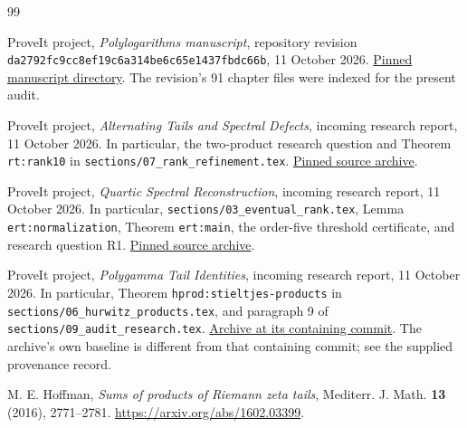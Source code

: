 \documentclass[11pt,letterpaper]{article}
\numberwithin{equation}{section}
\theoremstyle{definition}
\theoremstyle{remark}
\begin{document}
\clearpage
{}
{}
\begingroup\small
\begin{thebibliography}{99}
\raggedright
\setlength{\itemsep}{3pt}
\setlength{\parskip}{0pt}

ProveIt project,
\emph{Polylogarithms manuscript}, repository revision
\texttt{da2792fc9cc8ef19c6a314be6c65e1437fbdc66b},
11 October 2026.
\href{https://github.com/VladimirReshetnikov/ProveIt/tree/da2792fc9cc8ef19c6a314be6c65e1437fbdc66b/Analysis/Polylogarithms/docs/manuscript}{Pinned manuscript directory}.
The revision's 91 chapter files were indexed for the present audit.

ProveIt project,
\emph{Alternating Tails and Spectral Defects}, incoming research report,
11 October 2026. In particular, the two-product research question and
Theorem \texttt{rt:rank10} in \texttt{sections/07\_rank\_refinement.tex}.
\href{https://github.com/VladimirReshetnikov/ProveIt/blob/da2792fc9cc8ef19c6a314be6c65e1437fbdc66b/docs/incoming/ProveIt_Alternating_Tails_Spectral_Defects_2026-10-11.zip}{Pinned source archive}.

ProveIt project,
\emph{Quartic Spectral Reconstruction}, incoming research report,
11 October 2026. In particular, \texttt{sections/03\_eventual\_rank.tex},
Lemma \texttt{ert:normalization}, Theorem \texttt{ert:main}, the
order-five threshold certificate, and research question R1.
\href{https://github.com/VladimirReshetnikov/ProveIt/blob/da2792fc9cc8ef19c6a314be6c65e1437fbdc66b/docs/incoming/ProveIt_Quartic_Spectral_Reconstruction_2026-10-11.zip}{Pinned source archive}.

ProveIt project,
\emph{Polygamma Tail Identities}, incoming research report,
11 October 2026. In particular, Theorem
\texttt{hprod:stieltjes-products} in
\texttt{sections/06\_hurwitz\_products.tex}, and paragraph 9 of
\texttt{sections/09\_audit\_research.tex}.
\href{https://github.com/VladimirReshetnikov/ProveIt/blob/446dca9bd65c20e409d1d2561d4ffad408103e2a/docs/incoming/ProveIt_Polygamma_Tail_Identities_2026-10-11.zip}{Archive at its containing commit}.
The archive's own baseline is different from that containing commit;
see the supplied provenance record.

M. E. Hoffman,
\emph{Sums of products of Riemann zeta tails},
Mediterr. J. Math. \textbf{13} (2016), 2771--2781.
\url{https://arxiv.org/abs/1602.03399}.


\end{thebibliography}
\end{document}
